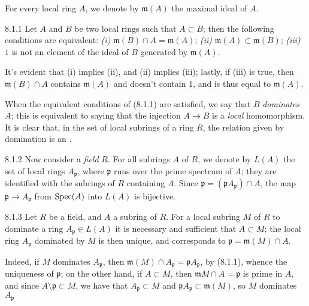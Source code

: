 \documentclass[../main.tex]{subfiles}
\begin{document}
For every local ring $A$, we denote by $\mathfrak{m}(A)$ the maximal ideal of $A$.

\begin{env}[Lemma]{8.1.1}
    Let $A$ and $B$ be two local rings such that $A\subset B$; then the following conditions are equivalent: \emph{(i)} $\mathfrak{m}(B)\cap A=\mathfrak{m}(A)$; \emph{(ii)} $\mathfrak{m}(A)\subset\mathfrak{m}(B)$; \emph{(iii)} $1$ is not an element of the ideal of $B$ generated by $\mathfrak{m}(A)$.
\end{env}

It's evident that (i) implies (ii), and (ii) implies (iii); lastly, if (iii) is true, then $\mathfrak{m}(B)\cap A$ contains $\mathfrak{m}(A)$ and doesn't contain $1$, and is thus equal to $\mathfrak{m}(A)$.

When the equivalent conditions of (8.1.1) are satisfied, we say that $B$ \emph{dominates} $A$; this is equivalent to saying that the injection $A\to B$ is a \emph{local} homomorphism.
It is clear that, in the set of local subrings of a ring $R$, the relation given by domination is an .

\begin{env}{8.1.2}
    Now consider a \emph{field} $R$.
    For all subrings $A$ of $R$, we denote by $L(A)$ the set of local rings $A_\mathfrak{p}$, where $\mathfrak{p}$ runs over the prime spectrum of $A$; they are identified with the subrings of $R$ containing $A$.
    Since $\mathfrak{p}=(\mathfrak{p}A_\mathfrak{p})\cap A$, the map $\mathfrak{p}\to A_\mathfrak{p}$ from $\operatorname{Spec}(A)$ into $L(A)$ is bijective.
\end{env}

\begin{env}[Lemma]{8.1.3}
    Let $R$ be a field, and $A$ a subring of $R$.
    For a local subring $M$ of $R$ to dominate a ring $A_\mathfrak{p}\in L(A)$ it is necessary and sufficient that $A\subset M$; the local ring $A_\mathfrak{p}$ dominated by $M$ is then unique, and corresponds to $\mathfrak{p}=\mathfrak{m}(M)\cap A$.
\end{env}

Indeed, if $M$ dominates $A_\mathfrak{p}$, then $\mathfrak{m}(M)\cap A_\mathfrak{p}=\mathfrak{p}A_\mathfrak{p}$, by (8.1.1), whence the uniqueness of $\mathfrak{p}$; on the other hand, if $A\subset M$, then $\mathfrak{m}M\cap A=\mathfrak{p}$ is prime in $A$, and since $A\setminus\mathfrak{p}\subset M$, we have that $A_\mathfrak{p}\subset M$ and $\mathfrak{p}A_\mathfrak{p}\subset\mathfrak{m}(M)$, so $M$ dominates $A_\mathfrak{p}$
\end{document}
